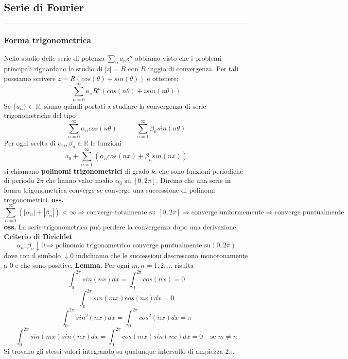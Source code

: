 \subsection*{Serie di Fourier}
\rule{\textwidth}{0,4pt}
\subsubsection*{Forma trigonometrica}
Nello studio delle serie di potenza $\sum_{n}a_n z^n$ abbiamo visto che i problemi principali riguardano lo studio di $|z| = R$ con $R$ raggio di convergenza. Per tali possiamo scrivere $z = R(cos(\theta) + sin(\theta))$ e ottenere:
\[
    \sum_{n=0}^{\infty} a_n R^n(cos(n \theta) + isin(n \theta))
\]
Se $\{a_n\} \subset \mathbb{R}$, siamo quindi portati a studiare la convergenza di serie trigonometriche del tipo
\[
    \sum_{n=0}^{\infty} \alpha_n cos(n \theta) \;\;\;\;\; \;\;\;\;\; \sum_{n=1}^{\infty} \beta_n sin(n \theta)
\]
Per ogni scelta di $\alpha_n, \beta_n \in \mathbb{R}$ le funzioni
\[
    a_0 + \sum_{n=1}^{\infty} (\alpha_n cos(nx) + \beta_n sin(n x))
\]
si chiamano \textbf{polinomi trigonometrici} di grado $k$; che sono funzioni periodiche di periodo $2\pi$ che hanno valor medio $\alpha_0$ su $[0, 2\pi]$.\newline
Diremo che una serie in fomra trigonometrica converge se converge una successione di polinomi trogonometrici.\newline
\textbf{oss.} 
\[
    \sum_{n=1}^{\infty} (|\alpha_n| + |\beta_n|) < \infty \Rightarrow \text{converge totalmente su } [0,2\pi] \Rightarrow \text{converge uniformemente} \Rightarrow \text{converge puntualmente}
\]
\textbf{oss.} La serie trigonometrica può perdere la convergenza dopo una derivazione.\newline
\newline
\textbf{Criterio di Dirichlet}
\[
    \alpha_n, \beta_n \downarrow 0 \Rightarrow \text{polinomio trigonometrico converge puntualmente su} (0,2\pi)
\]
dove con il simbolo $\downarrow 0$ indichiamo che le successioni descrescono monotonamente a $0$ e che sono positive.\newline
\newline
\textbf{Lemma.} Per ogni $m,n = 1,2,\dots$ risulta 
\[
    \int_{0}^{2\pi} sin(nx) dx = \int_{0}^{2\pi} cos(nx) = 0
\]
\[
    \int_{0}^{2\pi} sin(mx) cos(nx) dx = 0
\]
\[
    \int_{0}^{2\pi} sin^2(nx) dx = \int_{0}^{2\pi} cos^2(nx) dx = \pi
\]
\[
    \int_{0}^{2\pi} sin(mx) sin(nx) dx = \int_{0}^{2\pi} cos(mx) sin(nx) dx = 0 \;\;\;\; \text{se} \; m\neq n
\]
Si trovano gli stessi valori integrando su qualunque intervallo di ampiezza $2\pi$.\newline
